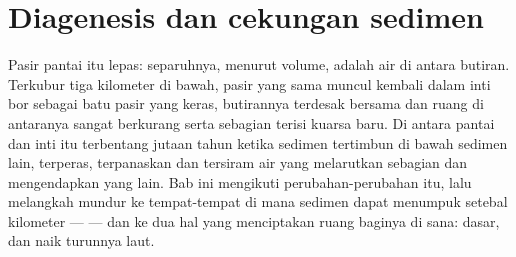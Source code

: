 \chapter{Diagenesis dan cekungan sedimen}\label{ch:b1:diagenesis-basins}

Pasir pantai itu lepas: separuhnya, menurut volume, adalah air di antara butiran. Terkubur tiga kilometer di bawah, pasir yang sama muncul kembali dalam inti bor sebagai batu pasir yang keras, butirannya terdesak bersama dan ruang di antaranya sangat berkurang serta sebagian terisi kuarsa baru. Di antara pantai dan inti itu terbentang jutaan tahun ketika sedimen tertimbun di bawah sedimen lain, terperas, terpanaskan dan tersiram air yang melarutkan sebagian  dan mengendapkan yang lain. Bab ini mengikuti perubahan-perubahan itu, lalu melangkah mundur ke tempat-tempat di mana sedimen dapat menumpuk setebal kilometer ---  --- dan ke dua hal yang menciptakan ruang baginya di sana:  dasar, dan naik turunnya laut.


